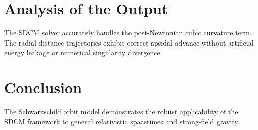 \section{Analysis of the Output}
The SDCM solver accurately handles the post-Newtonian cubic curvature term. The radial distance trajectories exhibit correct apsidal advance without artificial energy leakage or numerical singularity divergence.

\section{Conclusion}
The Schwarzschild orbit model demonstrates the robust applicability of the SDCM framework to general relativistic spacetimes and strong-field gravity.